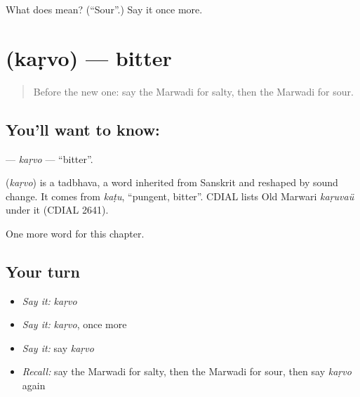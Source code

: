 \begin{tcolorbox}[breakable,colback=teal!4,colframe=teal!35!black,title={Before you move on}]
What does  mean? (\textquotedblleft{}Sour\textquotedblright{}.) Say it once more.
\end{tcolorbox}
\section[\texorpdfstring{\mw{कड़वो} (kaṛvo)}{कड़वो (kaṛvo)}]{ (kaṛvo) — bitter}

\label{lesson:MW-C143-karvo}



\begin{quote}
Before the new one: say the Marwadi for salty, then the Marwadi for sour.
\end{quote}

\subsection*{You'll want to know: }
\textbf{} — \emph{kaṛvo} — \textquotedblleft{}bitter\textquotedblright{}.

\begin{cousinweb}
\textbf{} (\emph{kaṛvo}) is a tadbhava, a word inherited from Sanskrit and reshaped by sound change. It comes from \emph{kaṭu}, \textquotedblleft{}pungent, bitter\textquotedblright{}. CDIAL lists Old Marwari \emph{kaṛuvaü} under it (CDIAL 2641).
\end{cousinweb}

\begin{grammarlens}[title={What you've built}]
One more word for this chapter.
\end{grammarlens}

\subsection*{Your turn}
\begin{itemize}
\raggedright
  \item \emph{Say it:} \emph{kaṛvo}
  \item \emph{Say it:} \emph{kaṛvo}, once more
  \item \emph{Say it:} say \emph{kaṛvo}
  \item \emph{Recall:} say the Marwadi for salty, then the Marwadi for sour, then say \emph{kaṛvo} again
\end{itemize}

